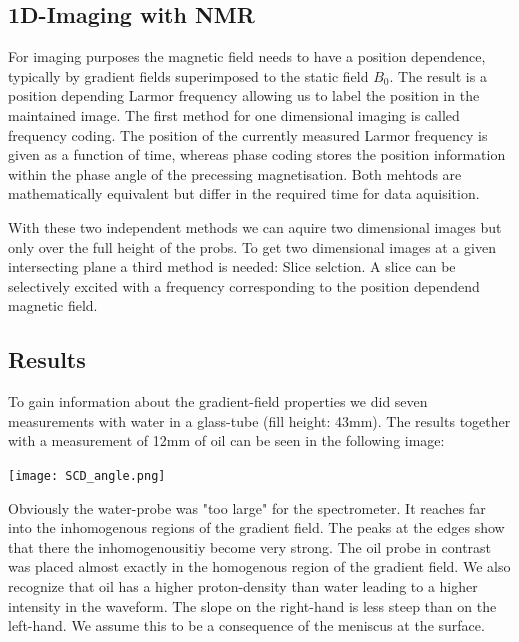 \documentclass[12pt, english]{scrartcl} %
\begin{document}
\begin{multicols}{2}
\newpage



\section{1D-Imaging with NMR}

For imaging purposes the magnetic field needs to have a position dependence, typically by gradient fields superimposed to the static field $B_0$. The result is a position depending Larmor frequency allowing us to label the position in the maintained image. 
The first method for one dimensional imaging is called frequency coding. The position of the currently measured Larmor frequency is given as a function of time, whereas phase coding stores the position information within the phase angle of the precessing magnetisation. Both mehtods are mathematically equivalent but differ in the required time for data aquisition.

With these two independent methods we can aquire two dimensional images but only over the full height of the probs. To get two dimensional images at a given intersecting plane a third method is needed: Slice selction. A slice can be selectively excited with a frequency corresponding to the position dependend magnetic field.


\subsection{Results}

To gain information about the gradient-field properties we did seven measurements with water in a glass-tube (fill height: 43mm). The results together with a measurement of 12mm of oil can be seen in the following image:

\begin{center}
\texttt{[image: SCD\_angle.png]}
\label{homogenous region}
\end{center}

Obviously the water-probe was "too large" for the spectrometer. It reaches far into the inhomogenous regions of the gradient field. The peaks at the edges show that there the inhomogenousitiy become very strong. The oil probe in contrast was placed almost exactly in the homogenous region of the gradient field. We also recognize that oil has a higher proton-density than water leading to a higher intensity in the waveform. The slope on the right-hand is less steep than on the left-hand. We assume this to be a consequence of the meniscus at the surface.


\end{multicols}
\end{document}
